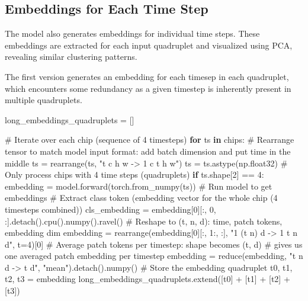 \documentclass[
  letterpaper,
  DIV=11,
  numbers=noendperiod]{scrreprt}
\newenvironment{Shaded}{\begin{snugshade}}{\end{snugshade}}
\newcommand{\BuiltInTok}[1]{\textcolor[rgb]{0.00,0.23,0.31}{#1}}
\newcommand{\CommentTok}[1]{\textcolor[rgb]{0.37,0.37,0.37}{#1}}
\newcommand{\ControlFlowTok}[1]{\textcolor[rgb]{0.00,0.23,0.31}{\textbf{#1}}}
\newcommand{\DecValTok}[1]{\textcolor[rgb]{0.68,0.00,0.00}{#1}}
\newcommand{\KeywordTok}[1]{\textcolor[rgb]{0.00,0.23,0.31}{\textbf{#1}}}
\newcommand{\NormalTok}[1]{\textcolor[rgb]{0.00,0.23,0.31}{#1}}
\newcommand{\OperatorTok}[1]{\textcolor[rgb]{0.37,0.37,0.37}{#1}}
\newcommand{\StringTok}[1]{\textcolor[rgb]{0.13,0.47,0.30}{#1}}
\begin{document}
\subsection{Embeddings for Each Time
Step}\label{embeddings-for-each-time-step}

The model also generates embeddings for individual time steps. These
embeddings are extracted for each input quadruplet and visualized using
PCA, revealing similar clustering patterns.

The first version generates an embedding for each timesep in each
quadruplet, which encounters some redundancy as a given timestep is
inherently present in multiple quadruplets.

\begin{Shaded}
\begin{Highlighting}[]
\NormalTok{long\_embeddings\_quadruplets }\OperatorTok{=}\NormalTok{ []}

\CommentTok{\# Iterate over each chip (sequence of 4 timesteps)}
\ControlFlowTok{for}\NormalTok{ ts }\KeywordTok{in}\NormalTok{ chips:}
    \CommentTok{\# Rearrange tensor to match model input format: add batch dimension and put time in the middle}
\NormalTok{    ts }\OperatorTok{=}\NormalTok{ rearrange(ts, }\StringTok{"t c h w {-}\textgreater{} 1 c t h w"}\NormalTok{)}
\NormalTok{    ts }\OperatorTok{=}\NormalTok{ ts.astype(np.float32)}
    \CommentTok{\# Only process chips with 4 time steps (quadruplets)}
    \ControlFlowTok{if}\NormalTok{ ts.shape[}\DecValTok{2}\NormalTok{] }\OperatorTok{==} \DecValTok{4}\NormalTok{:}
\NormalTok{        embedding }\OperatorTok{=}\NormalTok{ model.forward(torch.from\_numpy(ts)) }\CommentTok{\# Run model to get embeddings}
        \CommentTok{\# Extract class token (embedding vector for the whole chip (4 timesteps combined))}
\NormalTok{        cls\_embedding }\OperatorTok{=}\NormalTok{ embedding[}\DecValTok{0}\NormalTok{][:, }\DecValTok{0}\NormalTok{, :].detach().cpu().numpy().ravel()}
        \CommentTok{\# Reshape to (t, n, d): time, patch tokens, embedding dim}
\NormalTok{        embedding }\OperatorTok{=}\NormalTok{ rearrange(embedding[}\DecValTok{0}\NormalTok{][:, }\DecValTok{1}\NormalTok{:, :], }\StringTok{"1 (t n) d {-}\textgreater{} 1 t n d"}\NormalTok{, t}\OperatorTok{=}\DecValTok{4}\NormalTok{)[}\DecValTok{0}\NormalTok{]}
        \CommentTok{\# Average patch tokens per timestep: shape becomes (t, d)}
        \CommentTok{\# gives us one averaged patch embedding per timestep}
\NormalTok{        embedding }\OperatorTok{=} \BuiltInTok{reduce}\NormalTok{(embedding, }\StringTok{"t n d {-}\textgreater{} t d"}\NormalTok{, }\StringTok{"mean"}\NormalTok{).detach().numpy()}
        \CommentTok{\# Store the embedding quadruplet}
\NormalTok{        t0, t1, t2, t3 }\OperatorTok{=}\NormalTok{ embedding}
\NormalTok{        long\_embeddings\_quadruplets.extend([t0] }\OperatorTok{+}\NormalTok{ [t1] }\OperatorTok{+}\NormalTok{ [t2] }\OperatorTok{+}\NormalTok{ [t3])}
\end{Highlighting}
\end{Shaded}
\end{document}
